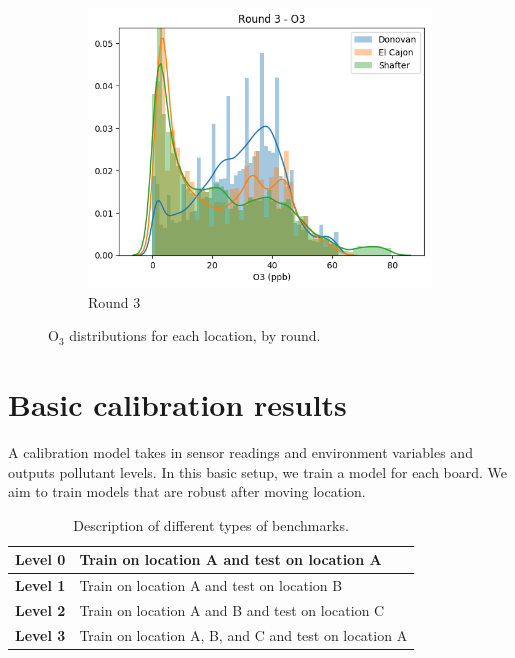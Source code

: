 \documentclass[journal abbreviation, manuscript]{copernicus}
\newcommand{\textus}[1]{$_{\text{#1}}$}
\begin{document}
\begin{figure}[H]
\begin{subfigure}{0.32\textwidth}
\includegraphics[width=\textwidth]{results/distributions/round3_o3.png}
\caption{Round 3}
\end{subfigure}
\caption{O\textus{3} distributions for each location, by round.}
\label{fig:o3-rounds}
\end{figure}

\iffalse
\section{Basic calibration results}

A calibration model takes in sensor readings and environment
variables and outputs pollutant levels. In this basic setup,
we train a model for each board.
We aim to train models that are robust after moving location.

\begin{table}[H]
\centering
\begin{tabular}{|l|l|}
\hline
\textbf{Level 0} & Train on location A and test on location A \\ \hline
\textbf{Level 1} & Train on location A and test on location B \\ \hline
\textbf{Level 2} & Train on location A and B and test on location C \\ \hline
\textbf{Level 3} & Train on location A, B, and C and test on location A \\ \hline
\end{tabular}
\caption{Description of different types of benchmarks.}
\label{tab:levels}
\end{table}
\end{document}
